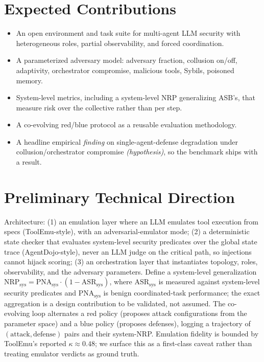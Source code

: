 \documentclass[11pt]{article}
\newcommand{\hyp}{\textit{(hypothesis)}\xspace}
\begin{document}
\section*{Expected Contributions}
\begin{itemize}
\item An open environment and task suite for multi-agent LLM security with heterogeneous roles, partial observability, and forced coordination.
\item A parameterized adversary model: adversary fraction, collusion on/off, adaptivity, orchestrator compromise, malicious tools, Sybils, poisoned memory.
\item System-level metrics, including a system-level NRP generalizing ASB's, that measure risk over the collective rather than per step.
\item A co-evolving red/blue protocol as a reusable evaluation methodology.
\item A headline empirical \emph{finding} on single-agent-defense degradation under collusion/orchestrator compromise \hyp, so the benchmark ships with a result.
\end{itemize}

\section*{Preliminary Technical Direction}
Architecture: (1) an emulation layer where an LLM emulates tool execution from specs (ToolEmu-style), with an adversarial-emulator mode; (2) a deterministic state checker that evaluates system-level security predicates over the global state trace (AgentDojo-style), never an LLM judge on the critical path, so injections cannot hijack scoring; (3) an orchestration layer that instantiates topology, roles, observability, and the adversary parameters. Define a system-level generalization $\mathrm{NRP}_{\text{sys}} = \mathrm{PNA}_{\text{sys}}\cdot(1-\mathrm{ASR}_{\text{sys}})$, where $\mathrm{ASR}_{\text{sys}}$ is measured against system-level security predicates and $\mathrm{PNA}_{\text{sys}}$ is benign coordinated-task performance; the exact aggregation is a design contribution to be validated, not assumed. The co-evolving loop alternates a red policy (proposes attack configurations from the parameter space) and a blue policy (proposes defenses), logging a trajectory of $(\text{attack},\text{defense})$ pairs and their system-NRP. Emulation fidelity is bounded by ToolEmu's reported $\kappa \approx 0.48$; we surface this as a first-class caveat rather than treating emulator verdicts as ground truth.
\end{document}
